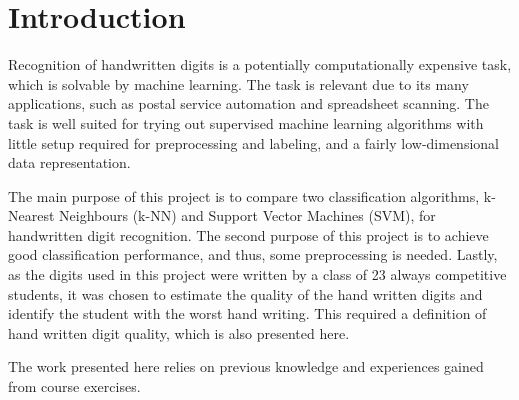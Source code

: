 \section{Introduction}
Recognition of handwritten digits is a potentially computationally expensive
task, which is solvable by machine learning. The task is
relevant due to its many applications, such as
postal service automation
and
spreadsheet scanning.
The task is well suited for trying out supervised machine learning algorithms
with little setup required for preprocessing and labeling,
and a fairly low-dimensional data representation.

The main purpose of this project is to compare two classification algorithms,
k-Nearest Neighbours (k-NN) and Support Vector Machines (SVM),
for handwritten digit recognition.
The second purpose of this project is to achieve good classification performance,
and thus, some preprocessing is needed.
Lastly, as the digits used in this project
were written by a class of 23 always competitive students,
it was chosen to estimate the quality of the hand written digits
and identify the student with the worst hand writing.
This required a definition of hand written digit quality,
which is also presented here.

The work presented here relies on previous knowledge
and experiences gained from course exercises.
